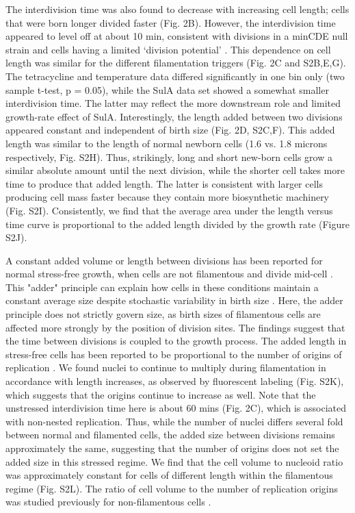 The interdivision time was also found to decrease with increasing cell length; cells that were born longer divided faster (Fig. 2B). However, the interdivision time appeared to level off at about 10 min, consistent with divisions in a minCDE null strain and cells having a limited ‘division potential’ \cite{Donachie1996}. This dependence on cell length was similar for the different filamentation triggers (Fig. 2C and S2B,E,G). The tetracycline and temperature data differed significantly in one bin only (two sample t-test, p = 0.05), while the SulA data set showed a somewhat smaller interdivision time. The latter may reflect the more downstream role and limited growth-rate effect of SulA. Interestingly, the length added between two divisions appeared constant and independent of birth size (Fig. 2D, S2C,F). This added length was similar to the length of normal newborn cells (1.6 vs. 1.8 microns respectively, Fig. S2H). Thus, strikingly, long and short new-born cells grow a similar absolute amount until the next division, while the shorter cell takes more time to produce that added length. The latter is consistent with larger cells producing cell mass faster because they contain more biosynthetic machinery (Fig. S2I). Consistently, we find that the average area under the length versus time curve is proportional to the added length divided by the growth rate (Figure S2J). 

A constant added volume or length between divisions has been reported for normal stress-free growth, when cells are not filamentous and divide mid-cell \cite{Amir2014, Campos2014, Taheri-Araghi2014, Wallden2016}. This "adder" principle can explain how cells in these conditions maintain a constant average size despite stochastic variability in birth size \cite{Amir2014, Campos2014, Taheri-Araghi2014}. Here, the adder principle does not strictly govern size, as birth sizes of filamentous cells are affected more strongly by the position of division sites. The findings suggest that the time between divisions is coupled to the growth process. The added length in stress-free cells has been reported to be proportional to the number of origins of replication \cite{Ho2015, Zheng2016}. We found nuclei to continue to multiply during filamentation in accordance with length increases, as observed by fluorescent labeling (Fig. S2K), which suggests that the origins continue to increase as well. Note that the unstressed interdivision time here is about 60 mins (Fig. 2C), which is associated with non-nested replication. Thus, while the number of nuclei differs several fold between normal and filamented cells, the added size between divisions remains approximately the same, suggesting that the number of origins does not set the added size in this stressed regime. We find that the cell volume to nucleoid ratio was approximately constant for cells of different length within the filamentous regime (Fig. S2L). The ratio of cell volume to the number of replication origins was studied previously for non-filamentous cells \cite{Si2017, Cooper1968}.


